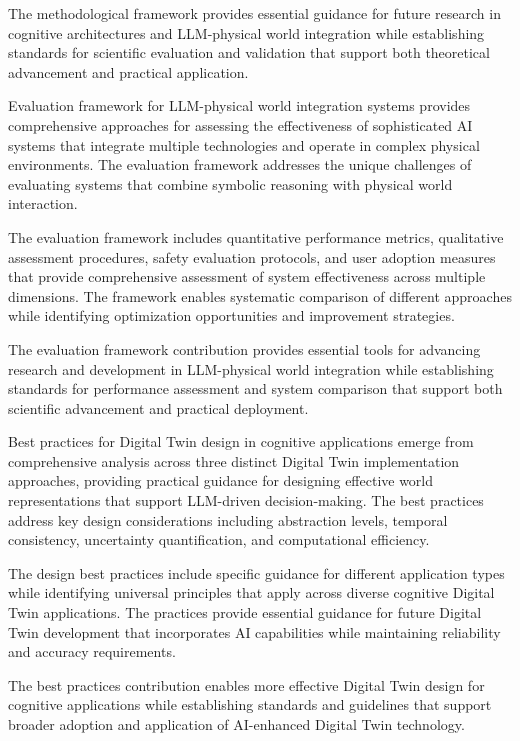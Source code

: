 The methodological framework provides essential guidance for future research in cognitive architectures and LLM-physical world integration while establishing standards for scientific evaluation and validation that support both theoretical advancement and practical application.

Evaluation framework for LLM-physical world integration systems provides comprehensive approaches for assessing the effectiveness of sophisticated AI systems that integrate multiple technologies and operate in complex physical environments. The evaluation framework addresses the unique challenges of evaluating systems that combine symbolic reasoning with physical world interaction.

The evaluation framework includes quantitative performance metrics, qualitative assessment procedures, safety evaluation protocols, and user adoption measures that provide comprehensive assessment of system effectiveness across multiple dimensions. The framework enables systematic comparison of different approaches while identifying optimization opportunities and improvement strategies.

The evaluation framework contribution provides essential tools for advancing research and development in LLM-physical world integration while establishing standards for performance assessment and system comparison that support both scientific advancement and practical deployment.

Best practices for Digital Twin design in cognitive applications emerge from comprehensive analysis across three distinct Digital Twin implementation approaches, providing practical guidance for designing effective world representations that support LLM-driven decision-making. The best practices address key design considerations including abstraction levels, temporal consistency, uncertainty quantification, and computational efficiency.

The design best practices include specific guidance for different application types while identifying universal principles that apply across diverse cognitive Digital Twin applications. The practices provide essential guidance for future Digital Twin development that incorporates AI capabilities while maintaining reliability and accuracy requirements.

The best practices contribution enables more effective Digital Twin design for cognitive applications while establishing standards and guidelines that support broader adoption and application of AI-enhanced Digital Twin technology.

